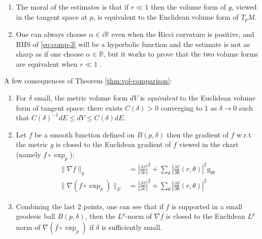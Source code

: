 \documentclass[11pt]{article}
\begin{document}
\begin{remark}
\label{rem:on-vol-comp}
\begin{enumerate}
\item The moral of the estimates is that if \(r\ll 1\) then the volume form of \(g\),
viewed in the tangent space at \(p\), is equivalent to the Euclidean volume form of \(T_pM\).
\item One can always choose \(\alpha\in i \mathbb{R}\) even when the Ricci curvature is
positive, and RHS of \eqref{eq:comp-3} will be a hyperbolic function and the estimate is
not as sharp as if one choose \(\alpha\in \mathbb{R}\), but it works to prove that
the two volume forms are equivalent when \(r \ll 1\) .
\end{enumerate}
\end{remark}

\begin{remark}
\label{rem:cor-vol-comp}
A few consequences of Theorem \ref{thm:vol-comparison}:
\begin{enumerate}
\item For \(\delta\) small, the metric volume form \(dV\) is \emph{equivalent} to the
Euclidean volume form of tangent space: there exists \(C(\delta)>0\) converging to \(1\) as \(\delta \to 0\) such that \(C(\delta)^{-1}dE \leq  dV \leq C(\delta) dE\).
\item Let \(f\) be a smooth function defined on \(B(p,\delta)\) then the gradient of \(f\) w.r.t the metric \(g\) is closed to the Euclidean gradient of \(f\) viewed in
the chart (namely \(f\circ \exp_p\)):
\begin{equation*}
\begin{split}
\|\nabla f\|_g &= \left|\frac{\partial f}{\partial r}\right|^2 + \sum_\theta \left|\frac{\partial f}{\partial \theta}(r,\theta)\right|^2 g_{\theta\theta}\\ 
\|\nabla (f\circ\exp_p)\|_E &= \left|\frac{\partial f}{\partial r}\right|^2 + \sum_\theta \left|\frac{\partial f}{\partial \theta}(r,\theta)\right|^2
\end{split}   
\end{equation*}
\item Combining the last 2 points, one can see that if \(f\) is supported in a small
geodesic ball \(B(p,\delta)\), then the \(L^p\)-norm of \(\nabla f\) is closed to
the Euclidean \(L^p\) norm of \(\nabla (f\circ \exp_p)\) if \(\delta\) is
sufficiently small.
\end{enumerate}
\end{remark}
\end{document}
